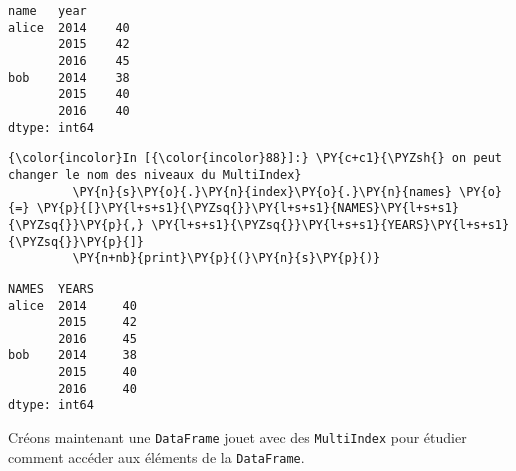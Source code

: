     \begin{Verbatim}[commandchars=\\\{\}]
name   year
alice  2014    40
       2015    42
       2016    45
bob    2014    38
       2015    40
       2016    40
dtype: int64

    \end{Verbatim}

    \begin{Verbatim}[commandchars=\\\{\}]
{\color{incolor}In [{\color{incolor}88}]:} \PY{c+c1}{\PYZsh{} on peut changer le nom des niveaux du MultiIndex}
         \PY{n}{s}\PY{o}{.}\PY{n}{index}\PY{o}{.}\PY{n}{names} \PY{o}{=} \PY{p}{[}\PY{l+s+s1}{\PYZsq{}}\PY{l+s+s1}{NAMES}\PY{l+s+s1}{\PYZsq{}}\PY{p}{,} \PY{l+s+s1}{\PYZsq{}}\PY{l+s+s1}{YEARS}\PY{l+s+s1}{\PYZsq{}}\PY{p}{]}
         \PY{n+nb}{print}\PY{p}{(}\PY{n}{s}\PY{p}{)}
\end{Verbatim}


    \begin{Verbatim}[commandchars=\\\{\}]
NAMES  YEARS
alice  2014     40
       2015     42
       2016     45
bob    2014     38
       2015     40
       2016     40
dtype: int64

    \end{Verbatim}

    Créons maintenant une \texttt{DataFrame} jouet avec des
\texttt{MultiIndex} pour étudier comment accéder aux éléments de la
\texttt{DataFrame}.

